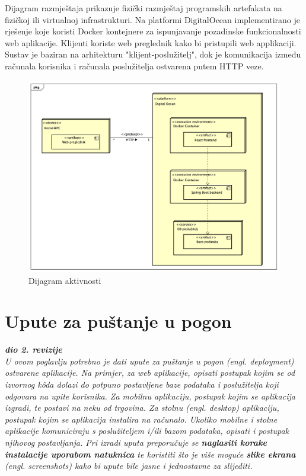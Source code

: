 			 \noindent Dijagram razmještaja prikazuje fizički razmještaj programskih artefakata 
			 na fizičkoj ili virtualnoj infrastrukturi. Na platformi DigitalOcean implementirano je
			 rješenje koje koristi Docker kontejnere za ispunjavanje pozadinske funkcionalnosti 
			 web aplikacije. Klijenti koriste web preglednik kako bi pristupili web applikaciji.
			 Sustav je baziran na arhitekturu "klijent-poslužitelj", dok je komunikacija između 
			 računala korisnika i računala poslužitelja ostvarena putem HTTP veze.
			

			\begin{figure}[H]
				\includegraphics[scale=0.28]{dijagrami/dijagram_razmjestaja.jpeg}
				\centering
				\caption{Dijagram aktivnosti}
				\label{fig:bpdiag}
			\end{figure}
			\eject 
		
		\section{Upute za puštanje u pogon}
		
			\textbf{\textit{dio 2. revizije}}\\
		
			 \textit{U ovom poglavlju potrebno je dati upute za puštanje u pogon (engl. deployment) ostvarene aplikacije. Na primjer, za web aplikacije, opisati postupak kojim se od izvornog kôda dolazi do potpuno postavljene baze podataka i poslužitelja koji odgovara na upite korisnika. Za mobilnu aplikaciju, postupak kojim se aplikacija izgradi, te postavi na neku od trgovina. Za stolnu (engl. desktop) aplikaciju, postupak kojim se aplikacija instalira na računalo. Ukoliko mobilne i stolne aplikacije komuniciraju s poslužiteljem i/ili bazom podataka, opisati i postupak njihovog postavljanja. Pri izradi uputa preporučuje se \textbf{naglasiti korake instalacije uporabom natuknica} te koristiti što je više moguće \textbf{slike ekrana} (engl. screenshots) kako bi upute bile jasne i jednostavne za slijediti.}
			
